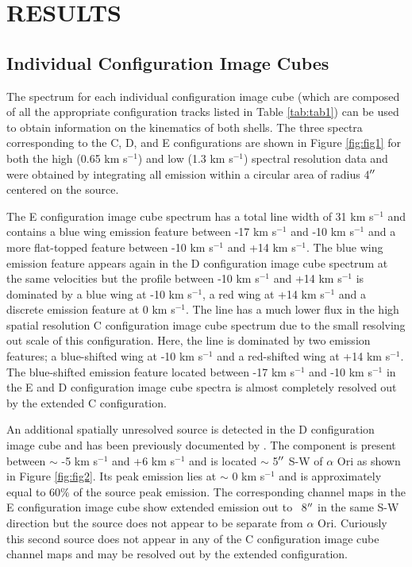 \documentclass[preprint2]{aastex}
\begin{document}
\section{RESULTS} 

\subsection{Individual Configuration Image Cubes} \label{results1} %

The spectrum for each individual configuration image cube (which are composed of all the appropriate configuration tracks listed in Table \ref{tab:tab1}) can be used to obtain information on the kinematics of both shells. The three spectra corresponding  to the C, D, and E configurations are shown in Figure \ref{fig:fig1} for both the high (0.65 km s${}^{-1}$) and low (1.3 km s${}^{-1}$) spectral resolution data and were obtained by integrating all emission within a circular area of radius 4$\mbox{$^{\prime\prime}$}$ centered on the source. 

The E configuration image cube spectrum has a total line width of 31 km s${}^{-1}$ and contains a blue wing emission feature between -17 km s${}^{-1}$ and -10 km s${}^{-1}$ and a more flat-topped feature between -10 km s${}^{-1}$ and +14 km s${}^{-1}$. The blue wing emission feature appears again in the D configuration image cube spectrum at the same velocities but the profile between -10 km s${}^{-1}$ and +14 km s${}^{-1}$ is dominated by a blue wing at -10 km s${}^{-1}$, a red wing at +14 km s${}^{-1}$ and a discrete emission feature at 0 km s${}^{-1}$. The line has a much lower flux in the high spatial resolution C configuration image cube spectrum due to the small resolving out scale of this configuration. Here, the line is dominated by two emission features; a blue-shifted wing at -10 km s${}^{-1}$ and a red-shifted wing at +14 km s${}^{-1}$. The blue-shifted emission feature located between -17 km s${}^{-1}$ and -10 km s${}^{-1}$ in the  E and D configuration image cube spectra is almost completely resolved out by the extended C configuration.

An additional spatially unresolved source is detected in the D configuration image cube and has been previously documented by \citet{2009AIPC.1094..868H}. The component is present between $\sim$ -5 km s${}^{-1}$ and +6 km s${}^{-1}$ and is located $\sim$ 5$\mbox{$^{\prime\prime}$}$ S-W of $\alpha$ Ori as shown in Figure \ref{fig:fig2}. Its peak emission lies at $\sim$ 0 km s${}^{-1}$ and is approximately equal to 60$\%$ of the source peak emission. The corresponding channel maps in the E configuration image cube show extended emission out to ~8$\mbox{$^{\prime\prime}$}$ in the same S-W direction but the source does not appear to be separate from $\alpha$ Ori. Curiously this second source does not appear in any of the C configuration image cube channel maps and may be resolved out by the extended configuration. 
\end{document}
